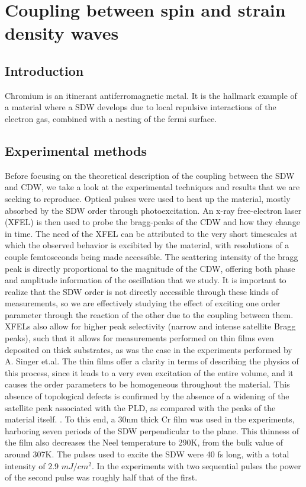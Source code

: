 \chapter{Coupling between spin and strain density waves}
\section{Introduction}

Chromium is an itinerant antiferromagnetic metal. It is the hallmark example of a material where a SDW develops due to local repulsive interactions of the electron gas, combined with a nesting of the fermi surface.

\section{Experimental methods}
Before focusing on the theoretical description of the coupling between the SDW and CDW, we take a look at the experimental techniques and results that we are seeking to reproduce. Optical pulses were used to heat up the material, mostly absorbed by the SDW order through photoexcitation. An x-ray free-electron laser (XFEL) is then used to probe the bragg-peaks of the CDW and how they change in time. The need of the XFEL can be attributed to the very short timescales at which the observed behavior is excibited by the material, with resolutions of a couple femtoseconds being made accessible.
The scattering intensity of the bragg peak is directly proportional to the magnitude of the CDW, offering both phase and amplitude information of the oscillation that we study. It is important to realize that the SDW order is not directly accessible through these kinds of measurements, so we are effectively studying the effect of exciting one order parameter through the reaction of the other due to the coupling between them.
XFELs also allow for higher peak selectivity (narrow and intense satellite Bragg peaks), such that it allows for measurements performed on thin films even deposited on thick substrates, as was the case in the experiments performed by A. Singer et.al. The thin films offer a clarity in terms of describing the physics of this process, since it leads to a very even excitation of the entire volume, and it causes the order parameters to be homogeneous throughout the material. This absence of topological defects is confirmed by the absence of a widening of the satellite peak associated with the PLD, as compared with the peaks of the material itself. .
To this end, a 30nm thick Cr film was used in the experiments, harboring seven periods of the SDW perpendicular to the plane. This thinness of the film also decreases the Neel temperature to 290K, from the bulk value of around 307K. The pulses used to excite the SDW were 40 fs long, with a total intensity of 2.9 $mJ/cm^2$. In the experiments with two sequential pulses the power of the second pulse was roughly half that of the first.

